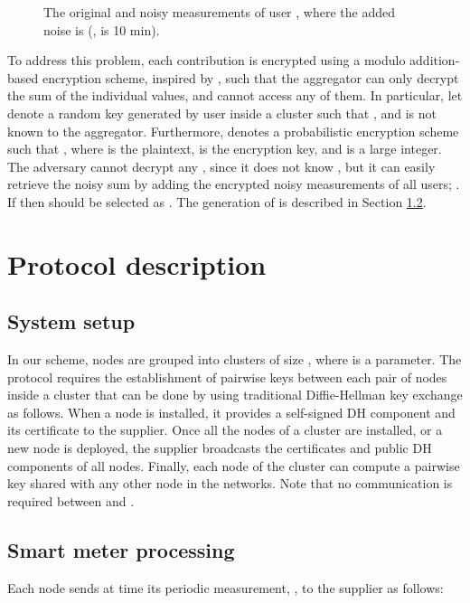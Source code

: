 \documentclass[11pt,a4paper]{article}
\theoremstyle{plain}
\theoremstyle{plain}
\theoremstyle{plain}
\theoremstyle{plain}
\theoremstyle{nonumberplain} \theoremseparator{}
\begin{document}
\begin{figure*}[ht]
\centering
{}
\caption{\label{fig:ill_noise} The original and noisy measurements of user , where the added noise is  (,  is 10 min). }
\end{figure*}

To address this problem, each contribution
is encrypted using a modulo addition-based encryption scheme, inspired by \cite{cc05mobiquitous}, 
such that the aggregator
can only decrypt the sum of the individual values, and cannot access any of them. 
In particular, let  denote a random key generated by user  inside a cluster such that , and  is not known to the aggregator. Furthermore,  denotes a probabilistic encryption scheme such that 
, where  is the plaintext,  is the encryption key, and  is a large integer.
The adversary cannot decrypt any , since it does not know , but it can easily retrieve the noisy sum by adding the encrypted noisy measurements of all users; . If  then  should be selected as  \cite{cc05mobiquitous}. The generation of  is described in Section \ref{sec:processing}.



\section{Protocol description}


\subsection{System setup}
\label{sec:setup}

In our scheme, nodes are grouped into clusters of size , where  is a
parameter. The protocol requires the establishment of pairwise keys between each
pair of nodes inside a cluster that can be done by using traditional Diffie-Hellman key 
exchange as follows. When a node  is installed, it provides a self-signed DH component and its certificate to the supplier. 
Once all the nodes of a cluster are installed, or a new node is deployed, the supplier broadcasts the certificates and public DH components of all nodes. Finally, each node  of the cluster can compute a pairwise key  shared with any other node  in the networks. Note that no communication is required between  and .

\subsection{Smart meter processing}
\label{sec:processing}
Each node  sends at time  its periodic measurement, , to the supplier as follows:
\end{document}
